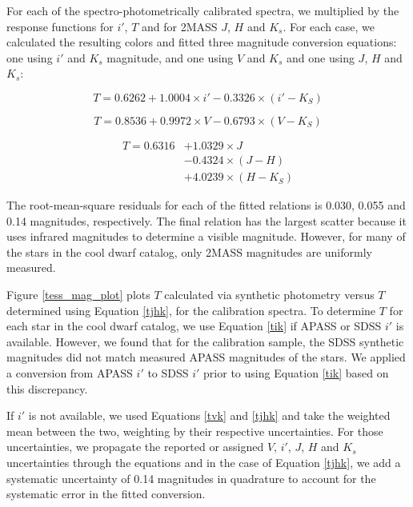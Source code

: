\documentclass[twocolumn]{aastex62}
\begin{document}
For each of the spectro-photometrically calibrated spectra, we multiplied by the response functions for $i'$, $T$ and for 2MASS $J$, $H$ and $K_s$.  For each case, we calculated the resulting colors and fitted three magnitude conversion equations: one using $i'$ and $K_s$ magnitude, and one using $V$ and $K_s$ and one using $J$, $H$ and $K_s$:

\begin{equation}
\label{tik}
T =  0.6262 + 1.0004 \times i' - 0.3326 \times (i' - K_S)
\end{equation}

\begin{equation}
\label{tvk}
T = 0.8536 + 0.9972 \times V - 0.6793 \times (V - K_S)
\end{equation}


\begin{equation}
\label{tjhk}
\begin{split}
T = 0.6316 & + 1.0329 \times J \\ & - 0.4324 \times (J - H) \\ & + 4.0239 \times (H - K_S)
\end{split}
\end{equation}

The root-mean-square residuals for each of the fitted relations is 0.030, 0.055 and 0.14 magnitudes, respectively.  The final relation has the largest scatter because it uses infrared magnitudes to determine a visible magnitude.  However, for many of the stars in the cool dwarf catalog, only 2MASS magnitudes are uniformly measured.

Figure \ref{tess_mag_plot} plots $T$ calculated via synthetic photometry versus $T$ determined using Equation \ref{tjhk}, for the calibration spectra.  To determine $T$ for each star in the cool dwarf catalog, we use Equation \ref{tik} if APASS or SDSS $i'$ is available.  However, we found that for the calibration sample, the SDSS synthetic magnitudes did not match measured APASS magnitudes of the stars.  We applied a conversion from APASS $i'$ to SDSS $i'$ prior to using Equation \ref{tik} based on this discrepancy.

If $i'$ is not available, we used Equations \ref{tvk} and \ref{tjhk} and take the weighted mean between the two, weighting by their respective uncertainties.  For those uncertainties, we propagate the reported or assigned $V$, $i'$, $J$, $H$ and $K_s$ uncertainties through the equations and in the case of Equation \ref{tjhk}, we add a systematic uncertainty of 0.14 magnitudes in quadrature to account for the systematic error in the fitted conversion.
\end{document}
